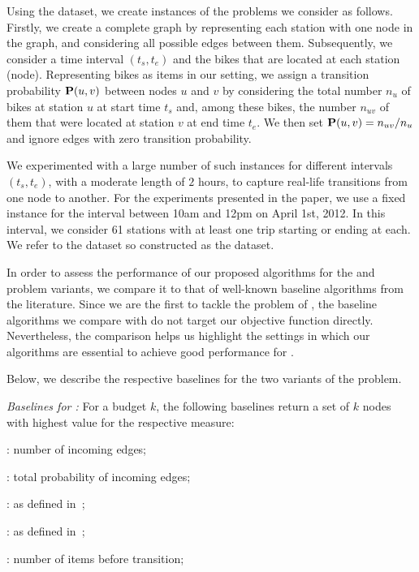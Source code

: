Using the dataset, we create instances of the problems we consider as follows.
Firstly, we create a complete graph by representing each station with one
node in the graph, and considering all possible edges between them.
Subsequently, we consider a time interval $(t_s, t_e)$ and the bikes that
are located at each station (node). 
Representing bikes as items in our setting, we assign a transition 
probability $\mathbf{P}(u,v)$ between nodes $u$ and $v$ by considering the 
total number $n_u$ of bikes at station $u$ at start time $t_s$ and, among these bikes,
the number $n_{uv}$ of them that were located at station $v$ at end time $t_e$.
We then set $\mathbf{P}(u,v) = n_{uv}/n_u$ and ignore edges with zero
transition probability.

We experimented with a large number of such instances for different intervals
$(t_s, t_e)$, with a moderate length of $2$ hours, to capture real-life
transitions from one node to another. For the experiments presented in the 
paper, we use a fixed instance for the interval between 10am and 12pm on
April 1st, 2012. In this interval, we consider 61 stations with at least one trip
starting or ending at each. We refer to the dataset so constructed as the {\hubway}
dataset.

In order to assess the performance of our proposed algorithms for the
{\nodeproblem} and {\edgeproblem} problem variants,
we compare it to that of well-known baseline algorithms from
the literature. Since we are the first to tackle the problem of
\mcproblem, the baseline algorithms we compare with do not target our objective
function directly. Nevertheless, the comparison helps us highlight the settings
in which our algorithms are essential to achieve good performance
for \mcproblem.

Below, we describe the respective baselines for the two variants of the problem.


\emph{Baselines for {\nodeproblem}:} For a budget $k$, the following baselines
return a set of $k$ nodes with highest value for the respective measure:
\squishlist
	\item {\indegree}: number of incoming edges;
	\item {\inprobability}: total probability of incoming edges;
	\item {\nodebetweenness}: as defined in~\cite{brandes01faster,erdos15divide,riondato16fast};
	\item {\closeness}: as defined in~\cite{sabidussi1966centrality};
	\item {\nodenumitems}: number of items before transition;
\squishend

